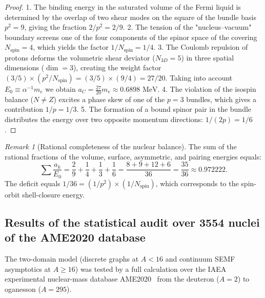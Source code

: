 \documentclass[11pt,a4paper]{article}
\theoremstyle{definition}
\theoremstyle{remark}
\newtheorem{remark}{Remark}
\begin{document}
\begin{proof}
	1. The binding energy in the saturated volume of the Fermi liquid is determined by the overlap of two shear modes on the square of the bundle basis $p^2 = 9$, giving the fraction $2/p^2 = 2/9$.
	2. The tension of the "nucleus--vacuum" boundary screens one of the four components of the spinor space of the covering $N_{\mathrm{spin}} = 4$, which yields the factor $1/N_{\mathrm{spin}} = 1/4$.
	3. The Coulomb repulsion of protons deforms the volumetric shear deviator ($N_{3D} = 5$) in three spatial dimensions ($\dim = 3$), creating the weight factor $(3/5) \times (p^2 / N_{\mathrm{spin}}) = (3/5) \times (9/4) = 27/20$. Taking into account $E_0 \equiv \alpha^{-1} m_e$ we obtain $a_C = \frac{27}{20} m_e \approx 0.6898\text{ MeV}$.
	4. The violation of the isospin balance ($N \ne Z$) excites a phase skew of one of the $p=3$ bundles, which gives a contribution $1/p = 1/3$.
	5. The formation of a bound spinor pair in the bundle distributes the energy over two opposite momentum directions: $1/(2p) = 1/6$.
\end{proof}

\begin{remark}[Rational completeness of the nuclear balance]
	The sum of the rational fractions of the volume, surface, asymmetric, and pairing energies equals:
\begin{equation}
	\sum \frac{a_k}{E_0} = \frac{2}{9} + \frac{1}{4} + \frac{1}{3} + \frac{1}{6} = \frac{8 + 9 + 12 + 6}{36} = \frac{35}{36} \approx 0.972222.
\label{eq:semf_fractions_sum_exact}
\end{equation}
The deficit equals $1/36 = (1/p^2) \times (1/N_{\mathrm{spin}})$, which corresponds to the spin-orbit shell-closure energy.
\end{remark}
\subsection{Results of the statistical audit over 3554 nuclei of the AME2020 database}

The two-domain model (discrete graphs at $A < 16$ and continuum SEMF asymptotics at $A \ge 16$) was tested by a full calculation over the IAEA experimental nuclear-mass database AME2020~\cite{AME2020} from the deuteron ($A=2$) to oganesson ($A=295$).
\end{document}
